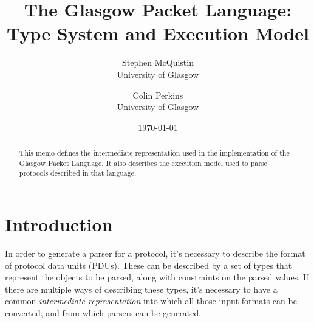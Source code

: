 \documentclass[10pt,twocolumn,a4paper]{article}
\begin{document}
\title{The Glasgow Packet Language: Type System and Execution Model}
\author{
  Stephen McQuistin\\University of Glasgow
\and 
  Colin Perkins\\University of Glasgow
}
\date{\today}
\maketitle
\begin{abstract}

  This memo defines the intermediate representation used in the
  implementation of the Glasgow Packet Language. It also describes
  the execution model used to parse protocols described in that
  language.

\end{abstract}
\section{Introduction}





In order to generate a parser for a protocol, it's necessary to describe
the format of protocol data units (PDUs).
These can be described by a set of types that represent the objects to be
parsed, along with constraints on the parsed values.
If there are multiple ways of describing these types, it's necessary to
have a common \emph{intermediate representation} into which all those input
formats can be converted, and from which parsers can be generated.

\end{document}
